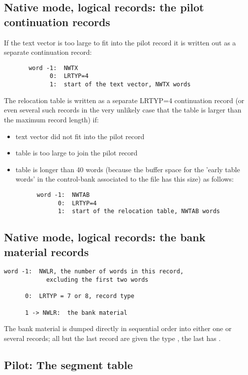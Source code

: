 \subsection{Native mode, logical records: the pilot continuation records}

If the text vector is too large to fit into the pilot record
it is written out as a separate  continuation record:

\begin{verbatim}
       word -1:  NWTX
             0:  LRTYP=4
             1:  start of the text vector, NWTX words
\end{verbatim}

The relocation table is written as a separate LRTYP=4 continuation
record (or even several such records in the very unlikely case
that the table is larger than the maximum record length) if:

\begin{itemize}
\item text vector did not fit into the pilot record
\item table is too large to join the pilot record
\item table is longer than 40 words (because the buffer space for
      the 'early table words' in the control-bank associated to the
      file has this size) as follows:
\begin{verbatim}
      word -1:  NWTAB
            0:  LRTYP=4
            1:  start of the relocation table, NWTAB words
\end{verbatim}
\end{itemize}

\subsection*{Native mode, logical records: the bank material records}

\begin{verbatim}
word -1:  NWLR, the number of words in this record,
            excluding the first two words

      0:  LRTYP = 7 or 8, record type

      1 -> NWLR:  the bank material
\end{verbatim}

The bank material is dumped directly in sequential order
into either one or several records;
all but the last record are given the type ,
the last has .

\subsection*{Pilot: The segment table}

